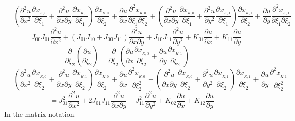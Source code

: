 \documentclass[a4paper,12pt]{article}
\begin{document}
$$= \left(\frac{\partial^2 u}{\partial x^2} \frac{\partial x_{_{K,0}}}{\partial \xi_1} + \frac{\partial^2 u}{\partial x \partial y} \frac{\partial x_{_{K,1}}}{\partial \xi_1} \right) \frac{\partial x_{_{K,0}}}{\partial \xi_2} + \frac{\partial u}{\partial x} \frac{\partial^2 x_{_{K,0}}}{\partial \xi_1 \partial \xi_2} + \left(\frac{\partial^2 u}{\partial x \partial y} \frac{\partial x_{_{K,0}}}{\partial \xi_1} + \frac{\partial^2 u}{\partial y^2} \frac{\partial x_{_{K,1}}}{\partial \xi_1} \right) \frac{\partial x_{_{K,1}}}{\partial \xi_2} + \frac{\partial u}{\partial y} \frac{\partial^2 x_{_{K,1}}}{\partial \xi_1 \partial \xi_2}$$
$$ = J_{00}J_{01} \frac{\partial^2 u}{\partial x^2} +  \left( J_{01} J_{10}  + J_{00}J_{11}\right)\frac{\partial^2 u}{\partial x \partial y} + J_{10}J_{11} \frac{\partial^2 u}{\partial y^2} +  K_{01} \frac{\partial u}{\partial x} +  K_{11} \frac{\partial u}{\partial y}
$$
\vspace*{5mm}
$$\frac{\partial}{\partial \xi_2}\left(\frac{\partial u}{\partial \xi_2} \right) = \frac{\partial}{\partial \xi_2}\left( \frac{\partial u}{\partial x} \frac{\partial x_{_{K,0}}}{\partial \xi_2} + \frac{\partial u}{\partial y} \frac{\partial x_{_{K,1}}}{\partial \xi_2} \right) =$$
$$= \left(\frac{\partial^2 u}{\partial x^2} \frac{\partial x_{_{K,0}}}{\partial \xi_2} + \frac{\partial^2 u}{\partial x \partial y} \frac{\partial x_{_{K,1}}}{\partial \xi_2} \right) \frac{\partial x_{_{K,0}}}{\partial \xi_2} + \frac{\partial u}{\partial x} \frac{\partial^2 x_{_{K,0}}}{\partial \xi_2^2} + \left(\frac{\partial^2 u}{\partial x \partial y} \frac{\partial x_{_{K,0}}}{\partial \xi_2} + \frac{\partial^2 u}{\partial y^2} \frac{\partial x_{_{K,1}}}{\partial \xi_2} \right) \frac{\partial x_{_{K,1}}}{\partial \xi_2} + \frac{\partial u}{\partial y} \frac{\partial^2 x_{_{K,1}}}{\partial \xi_2^2}$$
$$ = J_{01}^2 \frac{\partial^2 u}{\partial x^2} +  2 J_{01} J_{11}\frac{\partial^2 u}{\partial x \partial y} + J_{11}^2 \frac{\partial^2 u}{\partial y^2} +  K_{02} \frac{\partial u}{\partial x} +  K_{12} \frac{\partial u}{\partial y}
$$
In the matrix notation
\end{document}
